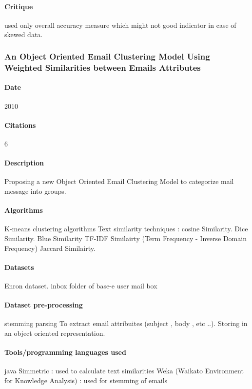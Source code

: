 \documentclass[12pt]{article}
\begin{document}
\paragraph{Critique}
used only overall accuracy measure which might not good indicator in case of skewed data.




\subsubsection{An Object Oriented Email Clustering Model Using Weighted Similarities between Emails Attributes}
\paragraph{Date} 2010
\paragraph{Citations}6
\paragraph{Description}
Proposing a new Object Oriented Email Clustering Model to categorize mail message into groups.

\paragraph{Algorithms}
K-means clustering algorithms
Text similarity techniques :
cosine Similarity.
Dice Similarity.
Blue Similarity
TF-IDF Similairty (Term Frequency - Inverse Domain Frequency)
Jaccard Similairty.

\paragraph{Datasets}
Enron dataset.
inbox folder of base-e user mail box

\paragraph{Dataset pre-processing}
stemming
parsing
To extract email attribuites (subject , body , etc ..).
Storing in an object oriented representation.

\paragraph{Tools/programming languages used}
java
Simmetric : used to calculate text similarities
Weka (Waikato Environment for Knowledge Analysis) : used for stemming of emails
\end{document}
